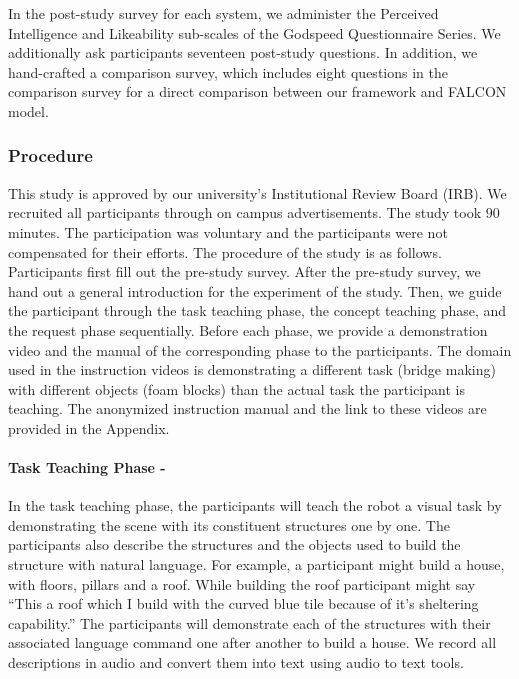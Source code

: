 In the post-study survey for each system, we administer the Perceived Intelligence and Likeability sub-scales of the Godspeed Questionnaire Series\cite{Bartneck2009MeasurementIF}.
We additionally ask participants seventeen post-study questions.
In addition, we hand-crafted a comparison survey, which includes eight questions in the comparison survey for a direct comparison between our framework and FALCON model.

\subsubsection{Procedure}
This study is approved by our university's Institutional Review Board (IRB). We recruited all participants through on campus advertisements. 
The study took $90$ minutes. The participation was voluntary and the participants were not compensated for their efforts. 
The procedure of the study is as follows. 
Participants first fill out the pre-study survey.
After the pre-study survey, we hand out a general introduction for the experiment of the study.
Then, we guide the participant through the task teaching phase, the concept teaching phase, and the request phase sequentially. 
Before each phase, we provide a demonstration video and the manual of the corresponding phase to the participants. The domain used in the instruction videos is demonstrating a different task (bridge making) with different objects (foam blocks) than the actual task the participant is teaching. 
The anonymized instruction manual and the link to these videos are provided in the Appendix.

\paragraph{Task Teaching Phase - } In the task teaching phase, the participants will teach the robot a visual task by demonstrating the scene with its constituent structures one by one. The participants also describe the structures and the objects used to build the structure with natural language. For example, a participant might build a house, with floors, pillars and a roof. While building the roof participant might say ``This a roof which I build with the curved blue tile because of it's sheltering capability.'' The participants will demonstrate each of the structures with their associated language command one after another to build a house. We record all descriptions in audio and convert them into text using audio to text tools.  

